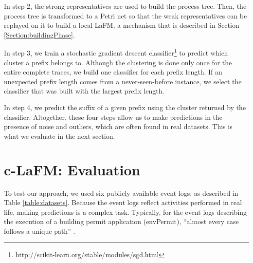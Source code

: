 \documentclass[runningheads]{llncs}
\begin{document}
In step 2, the strong representatives are used to build the process tree. Then, the process tree is transformed to a Petri net so that the weak representatives can be replayed on it to build a local LaFM, a mechanism that is described in Section \ref{Section:buildingPhase}. 

In step 3, we train a stochastic gradient descent classifier\footnote{http://scikit-learn.org/stable/modules/sgd.html} to predict which cluster a prefix belongs to. Although the clustering is done only once for the entire complete traces, we build one classifier for each prefix length. If an unexpected prefix length comes from a never-seen-before instance, we select the classifier that was built with the largest prefix length.

In step 4, we predict the suffix of a given prefix using the cluster returned by the classifier. Altogether, these four steps allow us to make predictions in the presence of noise and outliers, which are often found in real datasets. This is what we evaluate in the next section.


\section{c-LaFM: Evaluation}
\label{section:c-LaFM:evaluation}
To test our approach, we used six publicly available event logs, as described in Table \ref{table:datasets}. Because the event logs reflect activities performed in real life, making predictions is a complex task. Typically, for the event logs describing the execution of a building permit application (envPermit), ``almost every case follows a unique path'' \cite{tax2017predictive}.
\end{document}
